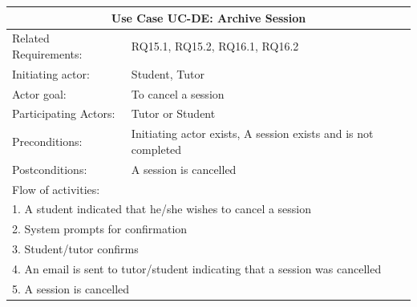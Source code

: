 \documentclass[12pt]{article}
\begin{document}
{    \begin{tabular}{| l | p{10cm}| }
			\hline\multicolumn{2}{|c|}{ \textbf{Use Case UC-DE: Archive Session} }\\ \hline
			Related Requirements: &  RQ15.1, RQ15.2, RQ16.1, RQ16.2\\ \hline
			Initiating actor: & Student, Tutor \\ \hline
			Actor goal: & To cancel a session\\ \hline
			Participating Actors: & Tutor or Student\\ \hline
			Preconditions: &Initiating actor exists, A session exists and is not completed\\ \hline
			Postconditions: & A session is cancelled\\ \hline
			\multicolumn{2}{|l|}{Flow of activities:}\\ \hline
			\multicolumn{2}{|p{15cm}|}{1. A student indicated that he/she wishes to cancel a session}\\
			\multicolumn{2}{|p{15cm}|}{2. System prompts for confirmation}\\
			\multicolumn{2}{|l|}{3. Student/tutor confirms}\\
			\multicolumn{2}{|l|}{4. An email is sent to tutor/student indicating that a session was cancelled}\\
			\multicolumn{2}{|l|}{5. A session is cancelled}\\
			 \hline
		\end{tabular}

}
\end{document}

